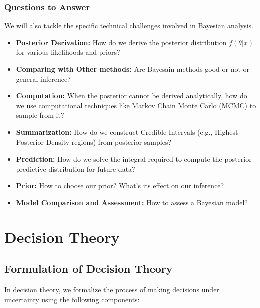 \documentclass[
  letterpaper,
  DIV=11,
  numbers=noendperiod]{scrreprt}
\providecommand{\tightlist}{%
  \setlength{\itemsep}{0pt}\setlength{\parskip}{0pt}}
\renewcommand{\[}{\begin{equation}}
\renewcommand{\]}{\end{equation}}
\theoremstyle{definition}
\theoremstyle{plain}
\theoremstyle{plain}
\theoremstyle{plain}
\theoremstyle{definition}
\theoremstyle{plain}
\theoremstyle{remark}
\begin{document}
\subsection{Questions to Answer}\label{questions-to-answer-1}

We will also tackle the specific technical challenges involved in
Bayesian analysis.

\begin{itemize}
\tightlist
\item
  \textbf{Posterior Derivation:} How do we derive the posterior
  distribution \(f(\theta|x)\) for various likelihoods and priors?
\item
  \textbf{Comparing with Other methods:} Are Bayesain methods good or
  not or general inference?
\item
  \textbf{Computation:} When the posterior cannot be derived
  analytically, how do we use computational techniques like Markov Chain
  Monte Carlo (MCMC) to sample from it?
\item
  \textbf{Summarization:} How do we construct Credible Intervals (e.g.,
  Highest Posterior Density regions) from posterior samples?
\item
  \textbf{Prediction:} How do we solve the integral required to compute
  the posterior predictive distribution for future data?
\item
  \textbf{Prior:} How to choose our prior? What's its effect on our
  inference?
\item
  \textbf{Model Comparison and Assessment:} How to assess a Bayesian
  model?
\end{itemize}


\chapter{Decision Theory}\label{decision-theory}

\section{Formulation of Decision
Theory}\label{formulation-of-decision-theory}

In decision theory, we formalize the process of making decisions under
uncertainty using the following components:
\end{document}
